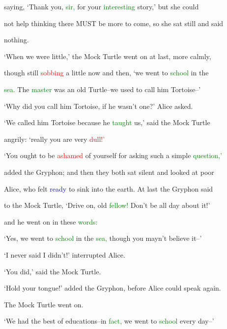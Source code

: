  saying, ‘Thank you, \textcolor{green}{sir,} for your \textcolor{green}{interesting} story,’ but she could

 not help thinking there MUST be more to come, so she sat still and said

 nothing.



 ‘When we were little,’ the Mock Turtle went on at last, more calmly,

 though still \textcolor{red}{sobbing} a little now and then, ‘we went to \textcolor{green}{school} in the

 \textcolor{green}{sea.} The \textcolor{green}{master} was an old Turtle--we used to call him Tortoise--’



 ‘Why did you call him Tortoise, if he wasn’t one?’ Alice asked.



 ‘We called him Tortoise because he \textcolor{green}{taught} us,’ said the Mock Turtle

 angrily: ‘really you are very \textcolor{red}{dull!’}



 ‘You ought to be \textcolor{red}{ashamed} of yourself for asking such a simple \textcolor{green}{question,’}

 added the Gryphon; and then they both sat silent and looked at poor

 Alice, who felt \textcolor{blue}{ready} to sink into the earth. At last the Gryphon said

 to the Mock Turtle, ‘Drive on, old \textcolor{green}{fellow!} Don’t be all day about it!’

 and he went on in these \textcolor{green}{words:}



 ‘Yes, we went to \textcolor{green}{school} in the \textcolor{green}{sea,} though you mayn’t believe it--’



 ‘I never said I didn’t!’ \textcolor{BurntOrange}{interrupted} Alice.



 ‘You did,’ said the Mock Turtle.



 ‘Hold your tongue!’ added the Gryphon, before Alice could speak again.

 The Mock Turtle went on.



 ‘We had the best of educations--in \textcolor{green}{fact,} we went to \textcolor{green}{school} every day--’



